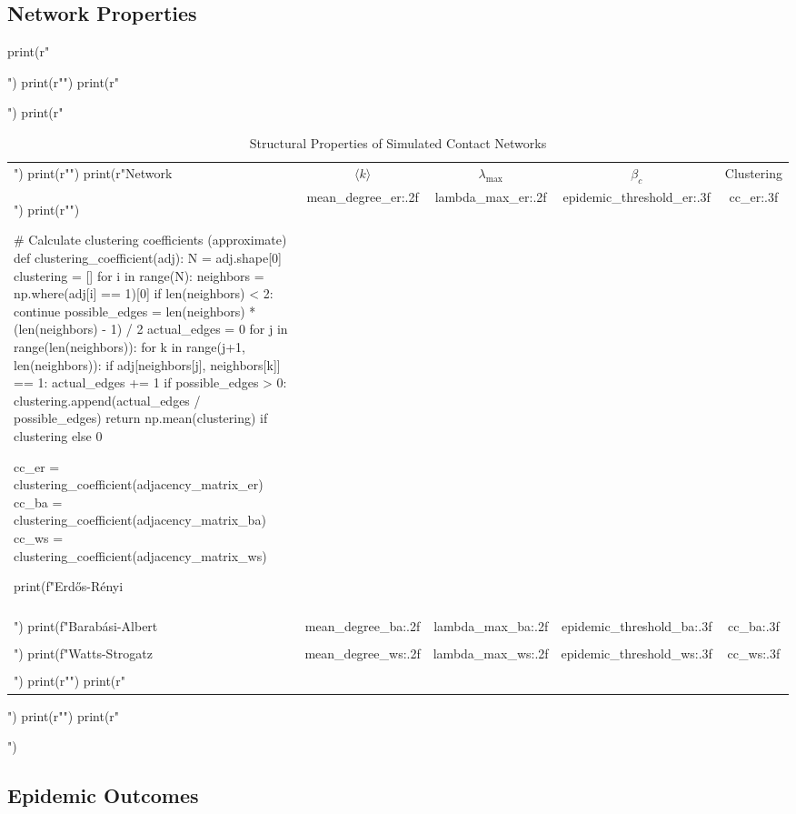 \documentclass[a4paper, 11pt]{article}
\begin{document}
\subsection{Network Properties}

\begin{pycode}
print(r"\begin{table}[htbp]")
print(r"\centering")
print(r"\caption{Structural Properties of Simulated Contact Networks}")
print(r"\begin{tabular}{lcccc}")
print(r"\toprule")
print(r"Network & $\langle k \rangle$ & $\lambda_{\max}$ & $\beta_c$ & Clustering \\")
print(r"\midrule")

# Calculate clustering coefficients (approximate)
def clustering_coefficient(adj):
    N = adj.shape[0]
    clustering = []
    for i in range(N):
        neighbors = np.where(adj[i] == 1)[0]
        if len(neighbors) < 2:
            continue
        possible_edges = len(neighbors) * (len(neighbors) - 1) / 2
        actual_edges = 0
        for j in range(len(neighbors)):
            for k in range(j+1, len(neighbors)):
                if adj[neighbors[j], neighbors[k]] == 1:
                    actual_edges += 1
        if possible_edges > 0:
            clustering.append(actual_edges / possible_edges)
    return np.mean(clustering) if clustering else 0

cc_er = clustering_coefficient(adjacency_matrix_er)
cc_ba = clustering_coefficient(adjacency_matrix_ba)
cc_ws = clustering_coefficient(adjacency_matrix_ws)

print(f"Erdős-Rényi & {mean_degree_er:.2f} & {lambda_max_er:.2f} & {epidemic_threshold_er:.3f} & {cc_er:.3f} \\\\")
print(f"Barabási-Albert & {mean_degree_ba:.2f} & {lambda_max_ba:.2f} & {epidemic_threshold_ba:.3f} & {cc_ba:.3f} \\\\")
print(f"Watts-Strogatz & {mean_degree_ws:.2f} & {lambda_max_ws:.2f} & {epidemic_threshold_ws:.3f} & {cc_ws:.3f} \\\\")
print(r"\bottomrule")
print(r"\end{tabular}")
print(r"\label{tab:network_properties}")
print(r"\end{table}")
\end{pycode}

\subsection{Epidemic Outcomes}
\end{document}
